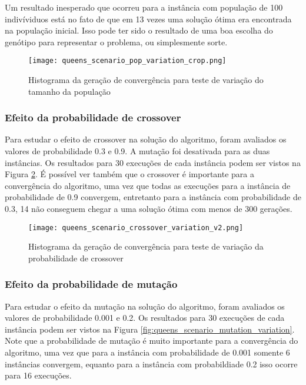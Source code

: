 \documentclass[conference]{IEEEtran}
\begin{document}
Um resultado inesperado que ocorreu para a instância com população de 100 indivíviduos está no fato de que em 13 vezes uma solução ótima era encontrada na população inicial. Isso pode ter sido o resultado de uma boa escolha do genótipo para representar o problema, ou simplesmente sorte. 

\begin{figure}[h!]
	\centering
	\texttt{[image: queens\_scenario\_pop\_variation\_crop.png]}
	\caption{Histograma da geração de convergência para teste de variação do tamanho da população}
	\label{fig:queens_scenario_pop_variation}
\end{figure}

\subsubsection{Efeito da probabilidade de crossover}

Para estudar o efeito de crossover na solução do algoritmo, foram avaliados os valores de probabilidade 0.3 e 0.9. A mutação foi desativada para as duas instâncias. Os resultados para 30 execuções de cada instância podem ser vistos na Figura \ref{fig:queens_scenario_crossover_variation}. É possível ver também que o crossover é importante para a convergência do algoritmo, uma vez que todas as execuções para a instância de probabilidade de 0.9 convergem, entretanto para a instância com probabilidade de 0.3, 14 não conseguem chegar a uma solução ótima com menos de 300 gerações.

\begin{figure}[h!]
	\centering
	\texttt{[image: queens\_scenario\_crossover\_variation\_v2.png]}
	\caption{Histograma da geração de convergência para teste de variação da probabilidade de crossover}
	\label{fig:queens_scenario_crossover_variation}
\end{figure}

\subsubsection{Efeito da probabilidade de mutação}

Para estudar o efeito da mutação na solução do algoritmo, foram avaliados os valores de probabilidade 0.001 e 0.2. Os resultados para 30 execuções de cada instância podem ser vistos na Figura \ref{fig:queens_scenario_mutation_variation}. Note que a probabilidade de mutação é muito importante para a convergência do algoritmo, uma vez que para a instância com probabilidade de 0.001 somente 6 instâncias convergem, equanto para a instância com probabildiade 0.2 isso ocorre para 16 execuções. 
\end{document}

